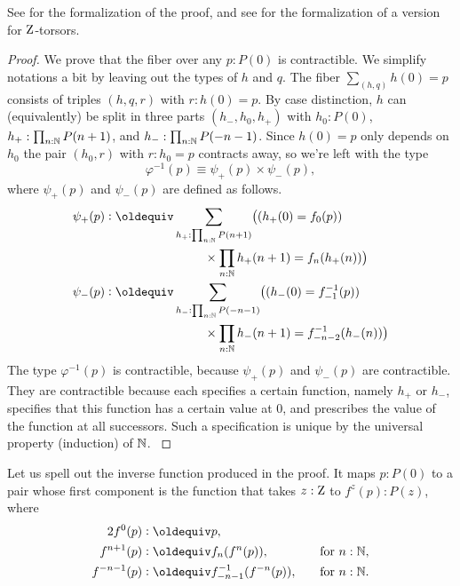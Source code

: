 \documentclass[a4paper,12pt]{amsart}
\begin{document}
See \cite[\href{https://github.com/UniMath/UniMath/blob/c856a5/UniMath/SyntheticHomotopyTheory/AffineLine.v\#L167}{AffineLine.v, line 167}]{UniMath}
for the formalization of the proof, and
see \cite[\href{https://github.com/UniMath/UniMath/blob/c856a5/UniMath/SyntheticHomotopyTheory/AffineLine.v\#L242}{AffineLine.v, line 242}]{UniMath}
for the formalization of a version for $\mathrm{Z}$-torsors.

\begin{proof}
  We prove that the fiber over any $p : P(0)$ is contractible.
  We simplify notations a bit by leaving out the types of $h$ and $q$.
  The fiber $\sum_{(h,q)} h(0)=p$ consists of triples $(h,q,r)$ with $r : h(0) = p$.
  By case distinction, $h$ can (equivalently) be split in three parts $(h_-,h_0,h_+)$
  with $h_0 : P(0)$, $h_+ : \prod_{n:\mathbb{N}}P(n+1)$,  and $h_- : \prod_{n:\mathbb{N}} P(-n-1)$.
  Since $h(0)=p$ only depends on $h_0$ the pair $(h_0,r)$ with  $r : h_0 = p$
  contracts away, so we're left with the type
  $$ \varphi^{-1}(p) \equiv \psi_+(p) \times \psi_-(p), $$
  \bgroup
  where $\psi_+(p)$ and $\psi_-(p)$ are defined as follows.
  \begin{align*}
    \psi_+(p) & \defeq  \sum_{h_+ : \prod_{n:\NN}P(n+1)}  \bigl((h_+(0) = f_0(p))         \\
    & \hspace {8em} \times \prod_{n:\NN}h_+(n+1) = f_n(h_+(n))\bigr) \\
    \psi_-(p) & \defeq  \sum_{h_- : \prod_{n:\NN}P(-n-1)} \bigl((h_-(0) = f_{-1}^{-1}(p))  \\
    & \hspace {8em} \times \prod_{n:\NN}h_-(n+1) = f_{-n-2}^{-1}(h_-(n))\bigr)
  \end{align*}
  The type $\varphi^{-1}(p)$ is contractible, because $\psi_+(p)$ and $\psi_-(p)$ are contractible.
  They are contractible because each specifies a certain function, namely $h_+$ or $h_-$,
  specifies that this function has a certain value at $0$,
  and prescribes the value of the function at all successors.
  Such a specification is unique by the universal property (induction) of $\mathbb{N}$.
  \egroup
\end{proof}

Let us spell out the inverse function produced in the proof.
It maps $p : P(0)$ to a pair whose first component
is the function that takes $z:\mathrm{Z}$ to $f^z(p):P(z)$, where
\begin{alignat*}2
  f^0(p) &\defeq p, && \\
  f^{n+1}(p) &\defeq f_n(f^n(p)),&\quad&\text{for $n:\NN$,} \\
  f^{-n-1}(p) &\defeq f_{-n-1}^{-1}(f^{-n}(p)),&\quad&\text{for $n:\NN$.}
\end{alignat*}
\end{document}
